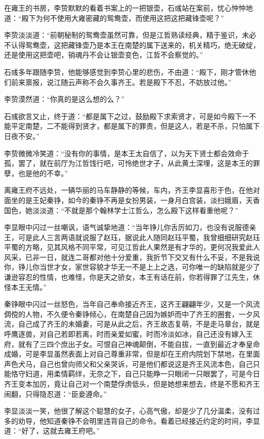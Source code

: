在雍王的书房，李贽默默的看着书案上的一把银壶，石彧站在案前，忧心忡忡地道：“殿下为何不使用大雍密藏的鸳鸯壶，而使用这把这把藏锋壶呢？”

李贽淡淡道：“前朝秘制的鸳鸯壶虽然可靠，但是江哲熟读经典，精于鉴识，未必不认得鸳鸯壶，这把藏锋壶乃是本王在南楚的属下送来的，机关精巧，绝无破绽，还是使用这把壶吧，销魂丹不会让银壶变色，江哲不会察觉的。”

石彧多年跟随李贽，他能够感觉到李贽心里的悲伤，不由道：“殿下，刚才管休他们前来禀报，说江随云声称不会久事齐王。若是殿下不忍，不妨放过他。”

李贽漠然道：“你真的是这么想的么？”

石彧欲言又止，终于道：“都是属下之过，鼓励殿下求索贤才，可是如今殿下一不能平定南楚，二不能得到贤才，都是属下的罪责，但是这人，若是不杀，只怕属下日夜不安。”

李贽微微冷笑道：“没有你的事情，是本王太自信了，以为天下贤士都会效命于孤，罢了，就在前厅为江哲饯行吧，可怜绝世才子，从此黄土深埋，这是本王的罪孽，也是他的不幸。”

离雍王府不远处，一辆华丽的马车静静的等候，车内，齐王李显喜形于色，在他对面坐的是王妃秦铮，如今的秦铮不再是女扮男装，一身月白宫装，淡扫娥眉，天香国色，她淡淡道：“不就是那个翰林学士江哲么，怎么殿下这样看重他呢？”

李显眼中闪过一丝嘲讽，语气诚挚地道：“当年铮儿你舌厉如刀，也没有说服德亲王，可是此人三言两语就说服了赵珏，据说此人随同赵珏平蜀，我曾细细研究赵珏平蜀的方略，见其风格不同平常，可见江哲此人果然是有才华的，更何况我爱此人风采，已非一日，就连二哥都对他十分爱重，我折节下交又有什么不妥，不是我说你，铮儿你当世才女，家世容貌才华无一不是上上之选，可你唯一的缺陷就是少了谦逊容忍的性情，也难怪，你是天之骄女，本王有话在前，你若得罪了江先生，休怪本王无情。”

秦铮眼中闪过一丝怒色，当年自己奉命接近齐王，这齐王翩翩年少，又是一个风流倜傥的人物，不久便令秦铮倾心，在南楚自己因为嫉妒而中了齐王的圈套，一夕风流，自己成了齐王的未婚妻，可是从此之后，齐王故态复萌，不是走马章台，就是呼鹰逐兽，对自己若即若离，时而亲爱如蜜，时而冷淡如冰，自己还没有嫁入王府，就有了三四个庶出子女。可恨自己神魂颠倒，不能自拔，一直到最近才奉皇命成婚，可是李显虽然表面上对自己尊重非常，但是却在王府内院划下禁地，在里面声色犬马，自己也曾向师父和父亲哭诉，可是他们都说这是齐王风流本色，自己只能恪守妇道，用柔情羁绊，无奈之下，自己只能睁一只眼闭一只眼罢了，可是今日齐王变本加厉，竟让自己对一个南楚俘虏低头，但是她想来想去，终是不愿和齐王闹翻，只得隐忍道：“臣妾遵命。”

李显淡淡一笑，他很了解这个聪慧的女子，心高气傲，却是少了几分温柔，没有过多的劝导，他知道秦铮不会明里违背自己的命令。看着已经接近约定的时间，李显道：“好了，这就去雍王府吧。”


